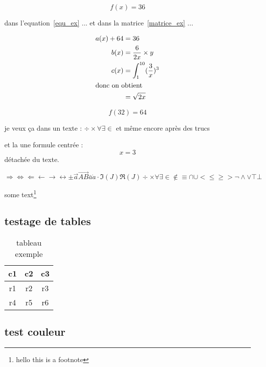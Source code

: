 \documentclass{article}
\begin{document}
\begin{equation}
f(x) = 36
\label{equ_ex}
\end{equation}

dans l'equation~\eqref{equ_ex} ... et dans la matrice~\eqref{matrice_ex} ...

\begin{align}
a(x) + 64 &= 36\\
b(x) &= \frac{6}{2x} \times y\\
c(x) &= \int_1^{10} (\frac{3}{x})^3\\
\intertext{donc on obtient}
&= \sqrt{2x}
\end{align}

\begin{equation*} %
    f(32) = 64
\end{equation*}

je veux ça dans un texte : $\div \times \forall \exists \in$ et même encore après des trucs\par
et la une formule centrée : \[x = 3\] détachée du texte.\par
$\Longrightarrow \Longleftrightarrow \Longleftarrow \longleftarrow \longrightarrow \longleftrightarrow \pm \vec{a} \overrightarrow{AB} \bar{a} \dot{a} \cdot \Im(J) \Re(J) \div \times \forall \exists \in \notin \equiv \cap \cup < \leq \geq > \lnot \land \lor \top \bot$
\newpage

some text\footnote{\label{myfootnote}hello this is a footnote}

\subsection{testage de tables}

\begin{table}[h!]
    \centering
    \caption{tableau exemple}
    \label{tableau}
    \begin{tabular}{c|c||c}
        \toprule
        c1 & c2 & c3\\
        \midrule
        r1 & r2 & r3\\
        r4 & r5 & r6\\
        \bottomrule
    \end{tabular}
\end{table}

\subsection{test couleur}
\end{document}
